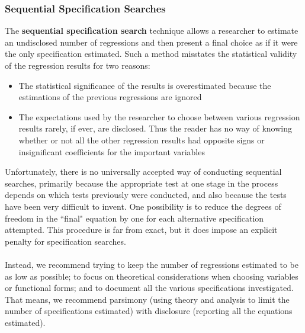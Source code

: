 \documentclass[11pt]{article}
\begin{document}
\subsubsection{Sequential Specification Searches}
The \textbf{sequential specification search} technique allows a researcher to estimate an undisclosed number of regressions and then present a final choice as if it were the only specification estimated. Such a method misstates the statistical validity of the regression results for two reasons:
\begin{itemize}
\item The statistical significance of the results is overestimated because the estimations of the previous regressions are ignored
\item The expectations used by the researcher to choose between various regression results rarely, if ever, are disclosed. Thus the reader has no way of knowing whether or not all the other regression results had opposite signs or insignificant coefficients for the important variables
\end{itemize}
Unfortunately, there is no universally accepted way of conducting sequential searches, primarily because the appropriate test at one stage in the process depends on which tests previously were conducted, and also because the tests have been very difficult to invent. One possibility is to reduce the degrees of freedom in the ``final" equation by one for each alternative specification attempted. This procedure is far from exact, but it does impose an explicit penalty for specification searches.\\ \\
Instead, we recommend trying to keep the number of regressions estimated to be as low as possible; to focus on theoretical considerations when choosing variables or functional forms; and to document all the various specifications investigated. That means, we recommend parsimony (using theory and analysis to limit the number of specifications estimated) with disclosure (reporting all the equations estimated).
\end{document}
